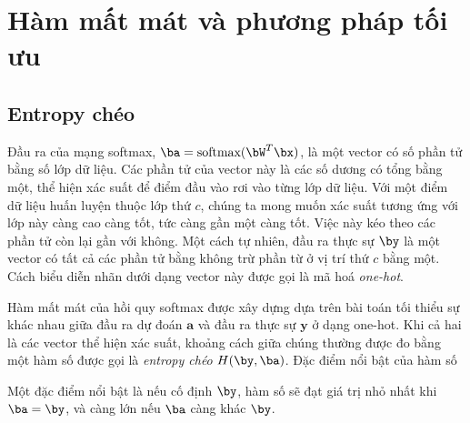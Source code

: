 \section{Hàm mất mát và phương pháp tối ưu }


\subsection{Entropy chéo}

\def\softmax{\text{softmax}}
Đầu ra của mạng softmax, $\ba = \softmax(\bW^T\bx)$, là một vector có số phần tử bằng số lớp dữ liệu. Các phần tử của vector này là các số dương có tổng bằng một, thể hiện xác suất để điểm đầu vào rơi vào từng lớp dữ liệu. Với một điểm dữ liệu huấn luyện thuộc lớp thứ $c$, chúng ta mong muốn xác suất tương ứng với lớp này càng cao càng tốt, tức càng gần một càng tốt. Việc này kéo theo các phần tử còn lại gần với không. Một cách tự nhiên, đầu ra thực sự $\by$ là một vector có tất cả các phần tử bằng không trừ phần từ ở vị trí thứ $c$ bằng một. Cách biểu diễn nhãn dưới dạng vector này được gọi là mã hoá \textit{one-hot}.


Hàm mất mát của hồi quy softmax được xây dựng dựa trên bài toán tối thiểu sự
khác nhau giữa {đầu ra dự đoán} $\mathbf{a}$ và {đầu ra thực sự}
$\mathbf{y}$ ở dạng one-hot. Khi cả hai là các vector thể hiện xác suất,
khoảng cách giữa chúng thường được đo bằng một hàm số được gọi là
\textit{entropy chéo} $H(\by, \ba)$. Đặc điểm nổi bật của hàm số

Một đặc điểm nổi bật là nếu cố định $\by$, hàm số sẽ đạt giá trị nhỏ nhất khi $\ba = \by$, và càng lớn nếu $\ba$ càng khác $\by$.


